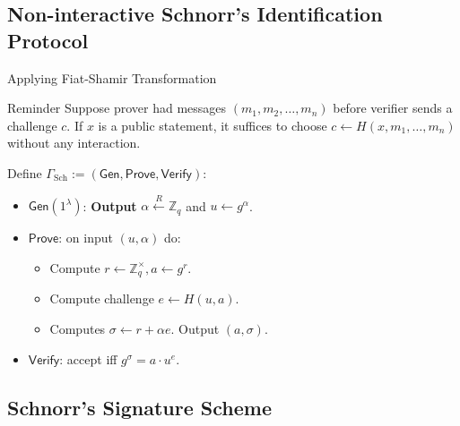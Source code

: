 \documentclass[xcolor={usenames,dvipsnames}]{beamer}
\begin{document}
    \subsection{Non-interactive Schnorr's Identification Protocol}
    \begin{frame}{Applying Fiat-Shamir Transformation}
        \begin{block}{Reminder}
            Suppose prover had messages $(m_1,m_2,\dots,m_n)$ before verifier sends a challenge $c$. If $x$ is a public statement, it suffices to choose $c \gets H(x,m_1,\dots,m_n)$ without any interaction.
        \end{block}

        \begin{definition}
            Define $\Gamma_{\text{Sch}} := (\mathsf{Gen}, \mathsf{Prove}, \mathsf{Verify})$:
            \begin{itemize}
                \item $\mathsf{Gen}(1^{\lambda})$: \textbf{Output} $\alpha \xleftarrow{R} \mathbb{Z}_q$ and $u \gets g^{\alpha}$.
                \item $\mathsf{Prove}$: on input $(u,\alpha)$ do:
                \begin{itemize}
                    \item Compute $r \gets \mathbb{Z}_q^{\times}, a \gets g^{r}$.
                    \item Compute challenge $e \gets H(u, a)$.
                    \item Computes $\sigma \gets r + \alpha e$. Output $(a,\sigma)$.
                \end{itemize}
                \item $\mathsf{Verify}$: accept iff $g^{\sigma} = a \cdot u^e$.
            \end{itemize}
        \end{definition}
    \end{frame}

    \subsection{Schnorr's Signature Scheme}
\end{document}
